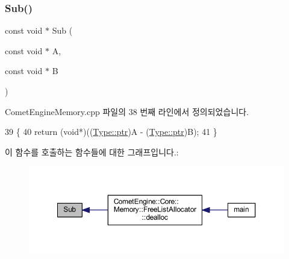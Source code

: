 \subsubsection{\texorpdfstring{Sub()}{Sub()}}
{\footnotesize\ttfamily const void $\ast$ Sub (\begin{DoxyParamCaption}\item[{const void $\ast$}]{A,  }\item[{const void $\ast$}]{B }\end{DoxyParamCaption})}



Comet\+Engine\+Memory.\+cpp 파일의 38 번째 라인에서 정의되었습니다.


\begin{DoxyCode}
39 \{
40     \textcolor{keywordflow}{return} (\textcolor{keywordtype}{void}*)((\hyperlink{namespace_comet_engine_1_1_type_aeb22ad46de677e9a50679dfebeb0e6f0}{Type::ptr})A - (\hyperlink{namespace_comet_engine_1_1_type_aeb22ad46de677e9a50679dfebeb0e6f0}{Type::ptr})B);
41 \}
\end{DoxyCode}
이 함수를 호출하는 함수들에 대한 그래프입니다.\+:
\nopagebreak
\begin{figure}[H]
\begin{center}
\leavevmode
\includegraphics[width=350pt]{namespace_comet_engine_1_1_core_1_1_memory_1_1_utils_a4e360b8988f0de099daa987e3b5f09ed_icgraph}
\end{center}
\end{figure}
